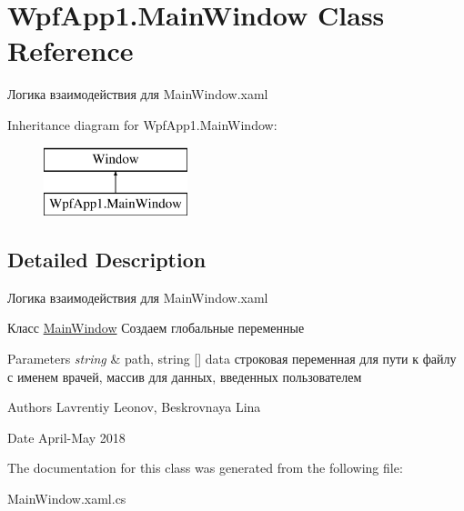 \hypertarget{class_wpf_app1_1_1_main_window}{}\section{Wpf\+App1.\+Main\+Window Class Reference}
\label{class_wpf_app1_1_1_main_window}


Логика взаимодействия для Main\+Window.\+xaml  


Inheritance diagram for Wpf\+App1.\+Main\+Window\+:\begin{figure}[H]
\begin{center}
\leavevmode
\includegraphics[height=2.000000cm]{class_wpf_app1_1_1_main_window}
\end{center}
\end{figure}


\subsection{Detailed Description}
Логика взаимодействия для Main\+Window.\+xaml 

Класс \mbox{\hyperlink{class_wpf_app1_1_1_main_window}{Main\+Window}} Создаем глобальные переменные 
\begin{DoxyParams}{Parameters}
{\em string} & path, string \mbox{[}\mbox{]} data строковая переменная для пути к файлу с именем врачей, массив для данных, введенных пользователем \\
\hline
\end{DoxyParams}
\begin{DoxyAuthor}{Authors}
Lavrentiy Leonov, Beskrovnaya Lina 
\end{DoxyAuthor}
\begin{DoxyDate}{Date}
April-\/\+May 2018 
\end{DoxyDate}


The documentation for this class was generated from the following file\+:\begin{DoxyCompactItemize}
\item 
Main\+Window.\+xaml.\+cs\end{DoxyCompactItemize}
